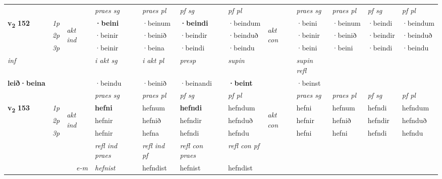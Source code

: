 \begin{longtable}[l]{X>{\footnotesize\itshape}llXXXXlXXXX}
 & &   & \textit{praes sg}  & \textit{praes pl}    & \textit{ pf sg} & \textit{pf pl} & & \textit{praes sg}  & \textit{praes pl}    & \textit{pf sg} & \textit{pf pl }  \\ \cmidrule{4-7} \cmidrule{9-12}
 \multirow{2}{*}{{{\textbf{v{\textsubscript{2}}} \Large{\textbf{152}}}}}  & 1p & \multirow{3}{*}{\begin{turn}{90}\textit{akt ind}\end{turn}} & \textbf{·beini} & ·beinum & \textbf{·beindi} & ·beindum & \multirow{3}{*}{\begin{turn}{90}\textit{akt con}\end{turn}} &·beini & ·beinum & ·beindi & ·beindum\\*
 & 2p &  &  ·beinir  & ·beinið & ·beindir & ·beinduð & & ·beinir & ·beinið & ·beindir & ·beinduð \\*
 & 3p &  & ·beinir & ·beina & ·beindi & ·beindu & & ·beini & ·beini& ·beindi & ·beindu \\*
\cmidrule{4-7} \cmidrule{9-12}

   {\textit{inf}} & &  & \textit{i akt sg} & \textit{i akt pl}   & \textit{presp} & \textit{supin} && \textit{supin refl}  \\*
  {\textbf{leið\allowbreak ·beina}} & && ·beindu  & ·beinið   & ·beinandi &  \textbf{·beint} && ·beinst  \\*

\midrule

 & &   & \textit{praes sg}  & \textit{praes pl}    & \textit{ pf sg} & \textit{pf pl} & & \textit{praes sg}  & \textit{praes pl}    & \textit{pf sg} & \textit{pf pl }  \\ \cmidrule{4-7} \cmidrule{9-12}
 \multirow{2}{*}{{{\textbf{v{\textsubscript{2}}} \Large{\textbf{153}}}}}  & 1p & \multirow{3}{*}{\begin{turn}{90}\textit{akt ind}\end{turn}} & \textbf{hefni} & hefnum & \textbf{hefndi} & hefndum & \multirow{3}{*}{\begin{turn}{90}\textit{akt con}\end{turn}} &hefni & hefnum & hefndi & hefndum\\*
 & 2p &  &  hefnir  & hefnið & hefndir & hefnduð & & hefnir & hefnið & hefndir & hefnduð \\*
 & 3p &  & hefnir & hefna & hefndi & hefndu & & hefni & hefni& hefndi & hefndu \\*
\cmidrule{4-7} \cmidrule{9-12}

 & && \textit{refl ind praes} & \textit{refl ind pf} & \textit{refl con praes} & \textit{refl con pf} \\*
\multicolumn{3}{r}{\textit{e-m}}& hefnist & hefndist & hefnist & hefndist \\*


\end{longtable}
